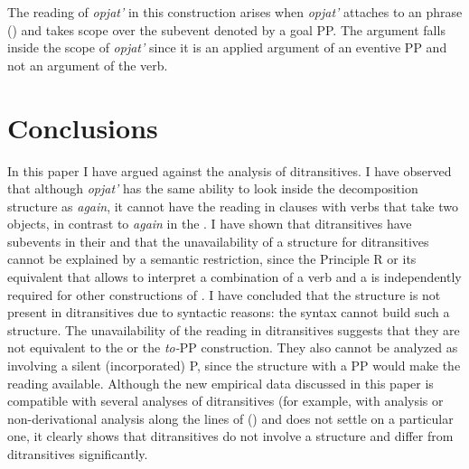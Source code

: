 \documentclass[output=paper]{langscibook}
\begin{document}
The  reading of \textit{opjat’} in this construction arises when \textit{opjat’} attaches to an  phrase () and takes scope over the  subevent denoted by a goal PP. The  argument falls inside the scope of \textit{opjat’} since it is an applied argument of an eventive PP and not an argument of the verb.


\section{Conclusions}\label{s6}

In this paper I have argued against the  analysis of  ditransitives. I have observed that although    \textit{opjat’} has the same ability to look inside the decomposition structure as  \textit{again}, it cannot have the  reading in clauses with  verbs that take two objects, in contrast to \textit{again} in the  . I have shown that  ditransitives have  subevents in their  and that the unavailability of a  structure for  ditransitives cannot be explained by a semantic restriction, since the Principle R or its equivalent that allows to interpret a combination of a verb and a  is independently required for other constructions of . I have concluded that the  structure is not present in  ditransitives due to syntactic reasons: the syntax cannot build such a structure. The unavailability of the  reading in  ditransitives suggests that they are not equivalent to the   or the \textit{to-}PP construction. They also cannot be analyzed as involving a silent (incorporated) P, since the structure with a PP would make the  reading available. Although the new empirical data discussed in this paper is compatible with several analyses of ditransitives (for example, with  analysis \citep{Bruening2010} or non-derivational analysis along the lines of (\citealt{Boneh-Nash2017}) and does not settle on a particular one, it clearly shows that  ditransitives do not involve a  structure and differ from  ditransitives significantly.\largerpage
\end{document}
